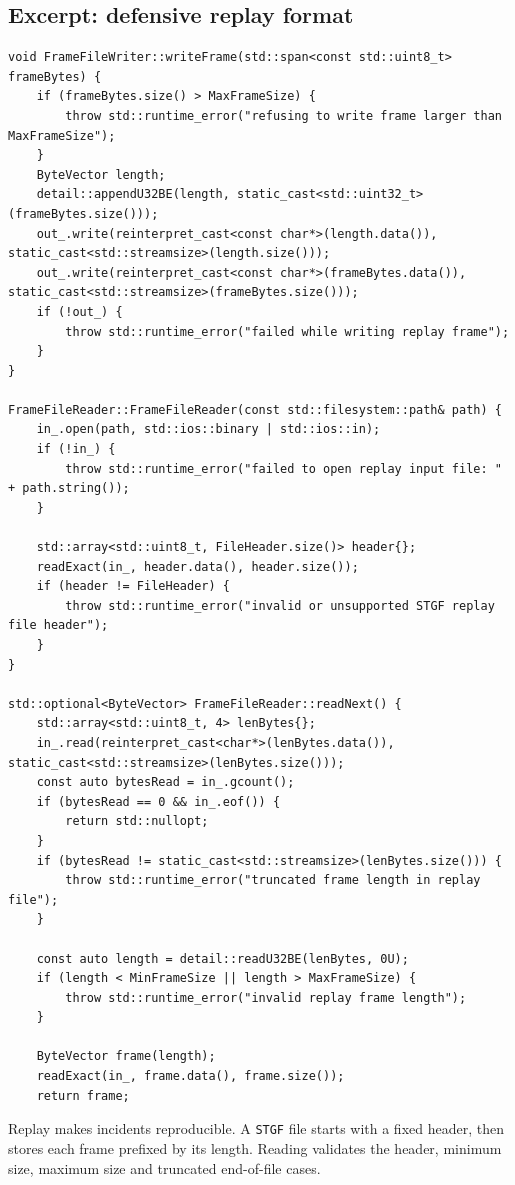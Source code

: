 \documentclass[10pt,a4paper]{article}
\begin{document}
\subsection{Excerpt: defensive replay format}
\begin{lstlisting}[caption={Reading and writing STGF replay files}]
void FrameFileWriter::writeFrame(std::span<const std::uint8_t> frameBytes) {
    if (frameBytes.size() > MaxFrameSize) {
        throw std::runtime_error("refusing to write frame larger than MaxFrameSize");
    }
    ByteVector length;
    detail::appendU32BE(length, static_cast<std::uint32_t>(frameBytes.size()));
    out_.write(reinterpret_cast<const char*>(length.data()), static_cast<std::streamsize>(length.size()));
    out_.write(reinterpret_cast<const char*>(frameBytes.data()), static_cast<std::streamsize>(frameBytes.size()));
    if (!out_) {
        throw std::runtime_error("failed while writing replay frame");
    }
}

FrameFileReader::FrameFileReader(const std::filesystem::path& path) {
    in_.open(path, std::ios::binary | std::ios::in);
    if (!in_) {
        throw std::runtime_error("failed to open replay input file: " + path.string());
    }

    std::array<std::uint8_t, FileHeader.size()> header{};
    readExact(in_, header.data(), header.size());
    if (header != FileHeader) {
        throw std::runtime_error("invalid or unsupported STGF replay file header");
    }
}

std::optional<ByteVector> FrameFileReader::readNext() {
    std::array<std::uint8_t, 4> lenBytes{};
    in_.read(reinterpret_cast<char*>(lenBytes.data()), static_cast<std::streamsize>(lenBytes.size()));
    const auto bytesRead = in_.gcount();
    if (bytesRead == 0 && in_.eof()) {
        return std::nullopt;
    }
    if (bytesRead != static_cast<std::streamsize>(lenBytes.size())) {
        throw std::runtime_error("truncated frame length in replay file");
    }

    const auto length = detail::readU32BE(lenBytes, 0U);
    if (length < MinFrameSize || length > MaxFrameSize) {
        throw std::runtime_error("invalid replay frame length");
    }

    ByteVector frame(length);
    readExact(in_, frame.data(), frame.size());
    return frame;
\end{lstlisting}


Replay makes incidents reproducible. A \texttt{STGF} file starts with a fixed header, then stores each frame prefixed by its length. Reading validates the header, minimum size, maximum size and truncated end-of-file cases.
\end{document}
